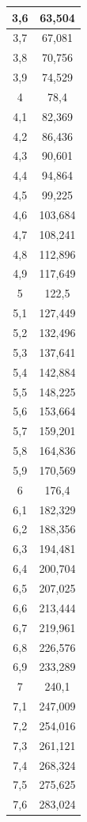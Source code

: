 \documentclass{article}
\begin{document}
\begin{center}
\begin{longtable}{|c|c|}
3,6 & 63,504  \\ \hline
3,7 & 67,081  \\ \hline
3,8 & 70,756  \\ \hline
3,9 & 74,529  \\ \hline
4   & 78,4    \\ \hline
4,1 & 82,369  \\ \hline
4,2 & 86,436  \\ \hline
4,3 & 90,601  \\ \hline
4,4 & 94,864  \\ \hline
4,5 & 99,225  \\ \hline
4,6 & 103,684 \\ \hline
4,7 & 108,241 \\ \hline
4,8 & 112,896 \\ \hline
4,9 & 117,649 \\ \hline
5   & 122,5   \\ \hline
5,1 & 127,449 \\ \hline
5,2 & 132,496 \\ \hline
5,3 & 137,641 \\ \hline
5,4 & 142,884 \\ \hline
5,5 & 148,225 \\ \hline
5,6 & 153,664 \\ \hline
5,7 & 159,201 \\ \hline
5,8 & 164,836 \\ \hline
5,9 & 170,569 \\ \hline
6   & 176,4   \\ \hline
6,1 & 182,329 \\ \hline
6,2 & 188,356 \\ \hline
6,3 & 194,481 \\ \hline
6,4 & 200,704 \\ \hline
6,5 & 207,025 \\ \hline
6,6 & 213,444 \\ \hline
6,7 & 219,961 \\ \hline
6,8 & 226,576 \\ \hline
6,9 & 233,289 \\ \hline
7   & 240,1   \\ \hline
7,1 & 247,009 \\ \hline
7,2 & 254,016 \\ \hline
7,3 & 261,121 \\ \hline
7,4 & 268,324 \\ \hline
7,5 & 275,625 \\ \hline
7,6 & 283,024 \\ \hline

\end{longtable}
\end{center}
\end{document}
